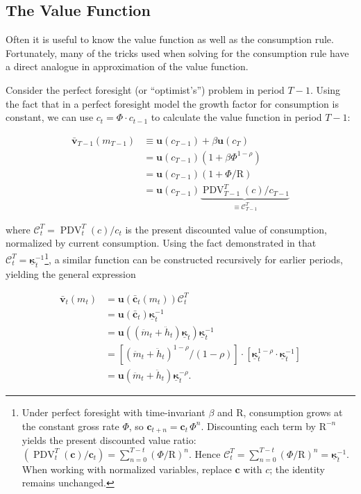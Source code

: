 \documentclass[twocolumn, switch]{article}
\newcommand{\CRRA}{\rho}
\newcommand{\cNrm}{c}
\newcommand{\uFunc}{\mathbf{u}}
\newcommand{\DiscFac}{\beta}
\newcommand{\cLvl}{\mathbf{c}}
\newcommand{\Rfree}{\text{R}}
\newcommand{\mNrm}{m}
\newcommand{\vFunc}{\mathbf{v}}
\newcommand{\AbsPatFac}{\Phi}
\newcommand{\cFunc}{\mathbf{c}}
\newcommand{\cFuncOpt}{\bar{\cFunc}}
\newcommand{\hNrm}{h}
\newcommand{\MPC}{\boldsymbol{\kappa}}
\newcommand{\MPCmin}{\underline{\MPC}}
\newcommand{\mNrmEx}{\ddot{\mNrm}}
\newcommand{\hNrmEx}{\ddot{\hNrm}}
\newcommand{\PDV}{\operatorname{PDV}}
\newcommand{\PDVCoverc}{\mathcal{C}}
\newcommand{\vFuncOpt}{\bar{\vFunc}}
\begin{document}
\subsection{The Value Function}

Often it is useful to know the value function as well as the consumption rule.
Fortunately, many of the tricks used when solving for the consumption rule have
a direct analogue in approximation of the value function.

Consider the perfect foresight (or ``optimist's'') problem in period $T -1$. Using
the fact that in a perfect foresight model the growth factor for consumption is
constant, we can use $\cNrm_{t} = \AbsPatFac \cdot \cNrm_{t -1}$ to calculate the value function in
period $T -1$:

\begin{equation}
\begin{aligned}
\vFuncOpt_{T-1}(\mNrm_{T-1}) &\equiv  \uFunc(\cNrm_{T-1})+\DiscFac \uFunc(\cNrm_{T}) \\
&= \uFunc(\cNrm_{T-1})\left(1+\DiscFac \AbsPatFac^{1-\CRRA}\right) \\
&= \uFunc(\cNrm_{T-1})\left(1+\AbsPatFac/\Rfree\right) \\
&= \uFunc(\cNrm_{T-1})\underbrace{\PDV_{T-1}^{T}(\cNrm)/\cNrm_{T-1}}_{\equiv \PDVCoverc_{T-1}^{T}}
\end{aligned}
\end{equation}

where $\PDVCoverc_{t}^{T}=\PDV_{t}^{T}(\cNrm)/\cNrm_{t}$ is the present discounted value
of consumption, normalized by current consumption. Using the fact demonstrated
in \citet{CarrollShanker2024} that
$\PDVCoverc_{t}^{T}=\MPCmin_{t}^{ -1}$\footnote{Under perfect foresight with time-invariant $\DiscFac$ and $\Rfree$, consumption
grows at the constant gross rate $\AbsPatFac$, so $\cLvl_{t+n}=\cLvl_{t}\,\AbsPatFac^{n}$.
Discounting each term by $\Rfree^{ -n}$ yields the present discounted value ratio:
$(\PDV_{t}^{T}(\cLvl)/\cLvl_{t})=\sum_{n=0}^{T -t}(\AbsPatFac/\Rfree)^{n}$.
Hence $\PDVCoverc_{t}^{T}=\sum_{n=0}^{T -t}(\AbsPatFac/\Rfree)^{n}=\MPCmin_{t}^{ -1}$.
When working with normalized variables, replace $\cLvl$ with $\cNrm$; the identity
remains unchanged.}, a similar function can be
constructed recursively for earlier periods, yielding the general expression

\begin{equation}
\label{eq:vFuncPF}
\begin{aligned}
\vFuncOpt_{t}(\mNrm_{t}) &= \uFunc(\cFuncOpt_{t}(\mNrm_{t}))\PDVCoverc_{t}^{T} \\
&= \uFunc(\cFuncOpt_{t})\MPCmin_{t}^{-1} \\
&= \uFunc((\mNrmEx_{t}+\hNrmEx_{t})\MPCmin_{t}) \MPCmin_{t}^{-1} \\
&= \left[(\mNrmEx_{t}+\hNrmEx_{t})^{1-\CRRA}/(1-\CRRA)\right] \cdot \left[\MPCmin_{t}^{1-\CRRA} \cdot \MPCmin_{t}^{-1}\right] \\
&= \uFunc(\mNrmEx_{t}+\hNrmEx_{t})\MPCmin_{t}^{-\CRRA}.
\end{aligned}
\end{equation}
\end{document}
